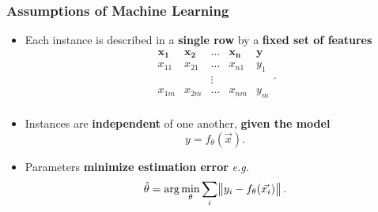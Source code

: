 \documentclass[bigger]{beamer}
\begin{document}
%
\begin{frame}
    \frametitle{Assumptions of Machine Learning}
    \begin{itemize}
        \item Each instance is described in a \textbf{single row} by a \textbf{fixed set of features}
              $$
                  \begin{array}{cccc|c}
                      \mathbf{x_1} & \mathbf{x_2} & \ldots & \mathbf{x_n} & \mathbf{y} \\
                      \hline
                      x_{11}       & x_{21}       & \ldots & x_{n1}       & y_1        \\
                                   &              & \vdots                             \\
                      x_{1m}       & x_{2m}       & \ldots & x_{nm}       & y_m        \\
                  \end{array}
                  .$$
        \item Instances are \textbf{independent} of one another, \textbf{given the model}
              $$
                  y = f_\theta(\vec{x}).
              $$
        \item Parameters \textbf{minimize estimation error} \emph{e.g.}
              $$
                  \hat{\theta} = \arg\min_\theta \sum_i \norm{y_i - f_\theta(\vec{x_{i}})}.
              $$
    \end{itemize}
\end{frame}
%
\end{document}
